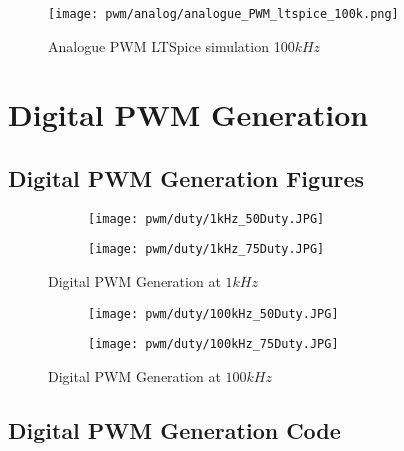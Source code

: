\begin{figure}[H]
    \texttt{[image: pwm/analog/analogue\_PWM\_ltspice\_100k.png]}
    \caption{Analogue PWM LTSpice simulation 100$kHz$}
\end{figure}


\chapter{Digital PWM Generation} \label{A:digital_PWM}

\section{Digital PWM Generation Figures}

\begin{figure}[H]
    \centering
    \begin{subfigure}{0.45\textwidth}
        \texttt{[image: pwm/duty/1kHz\_50Duty.JPG]}

    \end{subfigure}
    \begin{subfigure}{0.45\textwidth}
        \texttt{[image: pwm/duty/1kHz\_75Duty.JPG]}

    \end{subfigure}
    \caption{Digital PWM Generation at $1kHz$}

\end{figure}

\begin{figure}[H]
    \centering
    \begin{subfigure}{0.45\textwidth}
        \texttt{[image: pwm/duty/100kHz\_50Duty.JPG]}

    \end{subfigure}
    \begin{subfigure}{0.45\textwidth}
        \texttt{[image: pwm/duty/100kHz\_75Duty.JPG]}

    \end{subfigure}
    \caption{Digital PWM Generation at $100kHz$}

\end{figure}

\newpage
\section{Digital PWM Generation Code}

